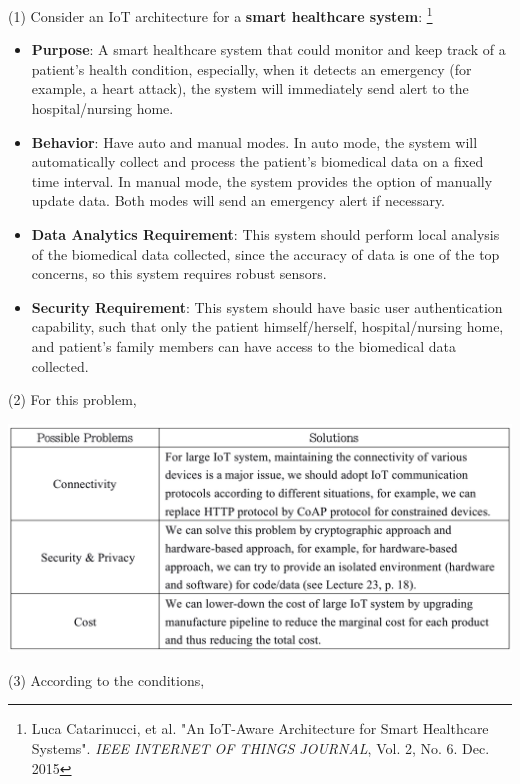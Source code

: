 \documentclass[11pt]{article}
\begin{document}



\begin{solution}
(1) Consider an IoT architecture for a \textbf{smart healthcare system}: \footnote{Luca Catarinucci, et al. "An IoT-Aware Architecture for Smart Healthcare Systems". \textit{IEEE INTERNET OF THINGS JOURNAL}, Vol. 2, No. 6. Dec. 2015}
\begin{itemize}
\item \textbf{Purpose}: A smart healthcare system that could monitor and keep track of a patient's health condition, especially, when it detects an emergency (for example, a heart attack), the system will immediately send alert to the hospital/nursing home.
\item \textbf{Behavior}: Have auto and manual modes. In auto mode, the system will automatically collect and process the patient's biomedical data on a fixed time interval. In manual mode, the 
system provides the option of manually update data. Both modes will send an emergency alert if necessary.
\item \textbf{Data Analytics Requirement}: This system should perform local analysis of the biomedical data collected, since the accuracy of data is one of the top concerns, so this system requires robust sensors.
\item \textbf{Security Requirement}: This system should have basic user authentication capability, such that only the patient himself/herself, hospital/nursing home, and patient's family members can have access to the biomedical data collected.
\end{itemize}
(2) For this problem,
\begin{center}
\includegraphics[width=15cm]{p1.png}
\end{center}
(3) According to the conditions,
\begin{itemize}

\end{itemize}
\end{solution}
\end{document}
